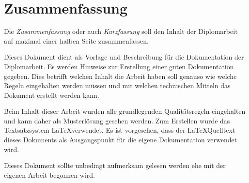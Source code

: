 

\chapter*{Zusammenfassung}



Die \emph{Zusammenfassung} oder auch \emph{Kurzfassung} soll den Inhalt der Diplomarbeit auf maximal einer halben Seite zusammenfassen.

Dieses Dokument dient als Vorlage und Beschreibung für die Dokumentation der Diplomarbeit.
Es werden Hinweise zur Erstellung einer guten Dokumentation gegeben.
Dies betrifft welchen Inhalt die Arbeit haben soll genauso wie welche Regeln eingehalten werden müssen und mit welchen technischen Mitteln das Dokument erstellt werden kann.

Beim Inhalt dieser Arbeit wurden alle grundlegenden Qualitätsregeln eingehalten und kann daher als Musterlösung gesehen werden.
Zum Erstellen wurde das Textsatzsystem \LaTeX verwendet.
Es ist vorgesehen, dass der \LaTeX Quelltext dieses Dokuments als Ausgangspunkt für die eigene Dokumentation verwendet wird.

Dieses Dokument sollte unbedingt aufmerksam gelesen werden ehe mit der eigenen Arbeit begonnen wird.

